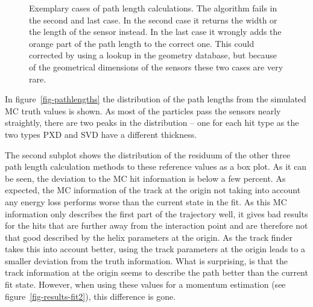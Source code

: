 \begin{figure}
  \caption[Exemplary cases of path length calculations.]{Exemplary cases of path length calculations. The algorithm fails in the second and last case. In the second case it returns the width or the length of the sensor instead. In the last case it wrongly adds the orange part of the path length to the correct one. This could corrected by using a lookup in the geometry database, but because of the geometrical dimensions of the sensors these two cases are very rare.}
  \label{fig-errors-in-path-length}
\end{figure}

In figure~\ref{fig-pathlengths} the distribution of the path lengths from the simulated MC truth values is shown. As most of the particles pass the sensors nearly straightly, there are two peaks in the distribution -- one for each hit type as the two types PXD and SVD have a different thickness.

The second subplot shows the distribution of the residuum of the other three path length calculation methods to these reference values as a box plot. As it can be seen, the deviation to the MC hit information is below a few percent. As expected, the MC information of the track at the origin not taking into account any energy loss performs worse than the current state in the fit. As this MC information only describes the first part of the trajectory well, it gives bad results for the hits that are further away from the interaction point and are therefore not that good described by the helix parameters at the origin. As the track finder takes this into account better, using the track parameters at the origin leads to a smaller deviation from the truth information. What is surprising, is that the track information at the origin seems to describe the path better than the current fit state. However, when using these values for a momentum estimation (see figure~\ref{fig-results-fit2}), this difference is gone.

